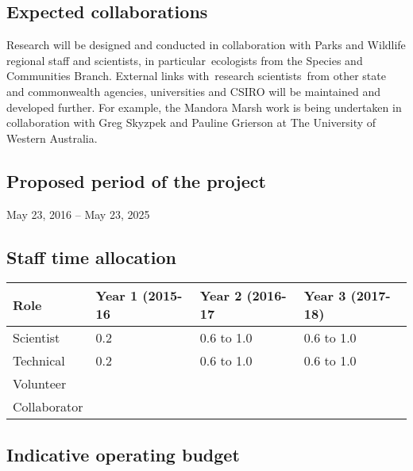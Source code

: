 \documentclass[version=last, 
    paper=a4, %
    10pt, %
    usenames,
    dvipsnames, 
    oneside, %
    headings=openany, %
    DIV=15 %
]{scrbook}
\begin{document}
\subsection*{Expected collaborations}
Research will be designed and conducted in collaboration with Parks and
Wildlife regional staff and scientists, in particular~ecologists from
the Species and Communities Branch. External links with~research
scientists~from other state and commonwealth agencies, universities and
CSIRO will be maintained and developed further. For example, the Mandora
Marsh work is being undertaken in collaboration with Greg Skyzpek and
Pauline Grierson at The University of Western Australia.


\subsection*{Proposed period of the project}
May 23, 2016 -- May 23, 2025



\subsection*{Staff time allocation }



\begin{longtabu} to \linewidth { |  X | X | X | X | }
\hline
{}
Role & Year 1 (2015-16 & Year 2 (2016-17 & Year 3 (2017-18)\\
\hline
\endhead



Scientist & 0.2 & 0.6 to 1.0 & 0.6 to 1.0\\



Technical & 0.2 & 0.6 to 1.0 & 0.6 to 1.0\\



Volunteer &  &  & \\



Collaborator &  &  & \\


\hline
\end{longtabu}



\subsection*{Indicative operating budget }
\end{document}
